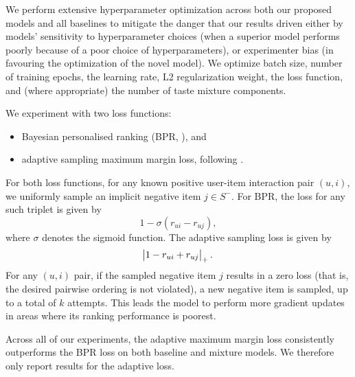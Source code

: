 \documentclass[sigchi]{acmart}
\newcommand\symUserInteractionSet{S}
\begin{document}
We perform extensive hyperparameter optimization across both our proposed models and all baselines to mitigate the danger that our results driven either by models' sensitivity to hyperparameter choices (when a superior model performs poorly because of a poor choice of hyperparameters), or experimenter bias (in favouring the optimization of the novel model). We optimize batch size, number of training epochs, the learning rate, L2 regularization weight, the loss function, and (where appropriate) the number of taste mixture components.

We experiment with two loss functions:
\begin{itemize}
\item Bayesian personalised ranking (BPR, \citet{rendle2009bpr}), and
\item adaptive sampling maximum margin loss, following \citet{weston2011wsabie}.
\end{itemize}
For both loss functions, for any known positive user-item interaction pair $(u, i)$, we uniformly sample an implicit negative item $j \in \symUserInteractionSet^-$. For BPR, the loss for any such triplet is given by
\begin{equation}
1 - \sigma\left(r_{ui} - r_{uj}\right),
\end{equation}
where $\sigma$ denotes the sigmoid function.
The adaptive sampling loss is given by
\begin{equation}
\abs{1 - r_{ui} + r_{uj}}_{+}.
\end{equation}
For any $(u, i)$ pair, if the sampled negative item $j$ results in a zero loss (that is, the desired pairwise ordering is not violated), a new negative item is sampled, up to a total of $k$ attempts. This leads the model to perform more gradient updates in areas where its ranking performance is poorest.

Across all of our experiments, the adaptive maximum margin loss consistently outperforms the BPR loss on both baseline and mixture models. We therefore only report results for the adaptive loss.
\end{document}
